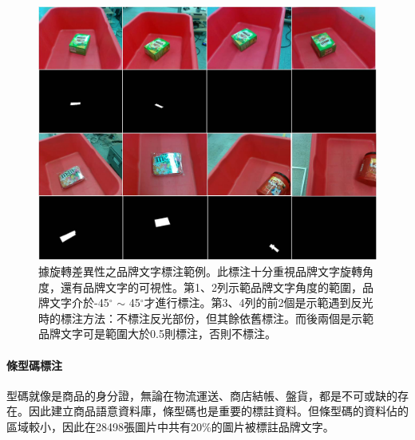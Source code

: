 \begin{figure}[ht]
	\centering
	\includegraphics[height=!, width=1.0\linewidth, keepaspectratio=true]
	{./figures/reak_bn_rule.jpg}
  \caption{據旋轉差異性之品牌文字標注範例。此標注十分重視品牌文字旋轉角度，還有品牌文字的可視性。第1、2列示範品牌文字角度的範圍，品牌文字介於-45$^{\circ}$ $\sim$ 45$^{\circ}$才進行標注。第3、4列的前2個是示範遇到反光時的標注方法：不標注反光部份，但其餘依舊標注。而後兩個是示範品牌文字可是範圍大於0.5則標注，否則不標注。}
  \label{figure:reak_bn_rule}
\end{figure}

\paragraph{條型碼標注}
型碼就像是商品的身分證，無論在物流運送、商店結帳、盤貨，都是不可或缺的存在。因此建立商品語意資料庫，條型碼也是重要的標註資料。但條型碼的資料佔的區域較小，因此在28498張圖片中共有20\%的圖片被標註品牌文字。

